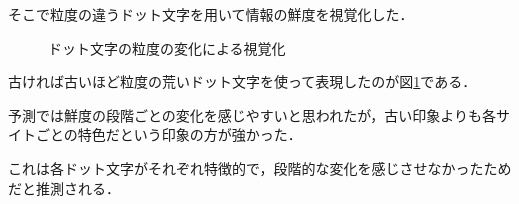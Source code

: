 そこで粒度の違うドット文字を用いて情報の鮮度を視覚化した．

\begin{figure}[htbp]
  \begin{center}
  \end{center}
  \caption{ドット文字の粒度の変化による視覚化}
  \label{fig:ver-dot}
\end{figure}

古ければ古いほど粒度の荒いドット文字を使って表現したのが図\ref{fig:ver-dot}である．

予測では鮮度の段階ごとの変化を感じやすいと思われたが，古い印象よりも各サイトごとの特色だという印象の方が強かった．

これは各ドット文字がそれぞれ特徴的で，段階的な変化を感じさせなかったためだと推測される．
